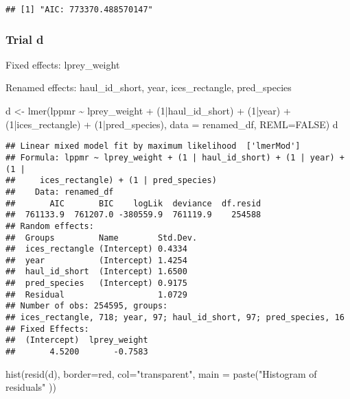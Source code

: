 \documentclass[
]{article}
\newenvironment{Shaded}{\begin{snugshade}}{\end{snugshade}}
\newcommand{\AttributeTok}[1]{\textcolor[rgb]{0.77,0.63,0.00}{#1}}
\newcommand{\ConstantTok}[1]{\textcolor[rgb]{0.00,0.00,0.00}{#1}}
\newcommand{\DecValTok}[1]{\textcolor[rgb]{0.00,0.00,0.81}{#1}}
\newcommand{\FunctionTok}[1]{\textcolor[rgb]{0.00,0.00,0.00}{#1}}
\newcommand{\NormalTok}[1]{#1}
\newcommand{\OtherTok}[1]{\textcolor[rgb]{0.56,0.35,0.01}{#1}}
\newcommand{\SpecialCharTok}[1]{\textcolor[rgb]{0.00,0.00,0.00}{#1}}
\newcommand{\StringTok}[1]{\textcolor[rgb]{0.31,0.60,0.02}{#1}}
\begin{document}
\begin{verbatim}
## [1] "AIC: 773370.488570147"
\end{verbatim}

\hypertarget{trial-d}{%
\subsubsection{Trial d}\label{trial-d}}

Fixed effects: lprey\_weight

Renamed effects: haul\_id\_short, year, ices\_rectangle, pred\_species

\begin{Shaded}
\begin{Highlighting}[]
\NormalTok{d }\OtherTok{\textless{}{-}} \FunctionTok{lmer}\NormalTok{(lppmr }\SpecialCharTok{\textasciitilde{}}\NormalTok{ lprey\_weight }\SpecialCharTok{+}\NormalTok{ (}\DecValTok{1}\SpecialCharTok{|}\NormalTok{haul\_id\_short) }\SpecialCharTok{+}\NormalTok{ (}\DecValTok{1}\SpecialCharTok{|}\NormalTok{year) }\SpecialCharTok{+}\NormalTok{ (}\DecValTok{1}\SpecialCharTok{|}\NormalTok{ices\_rectangle) }\SpecialCharTok{+}\NormalTok{ (}\DecValTok{1}\SpecialCharTok{|}\NormalTok{pred\_species), }\AttributeTok{data =}\NormalTok{ renamed\_df, }\AttributeTok{REML=}\ConstantTok{FALSE}\NormalTok{)}
\NormalTok{d}
\end{Highlighting}
\end{Shaded}

\begin{verbatim}
## Linear mixed model fit by maximum likelihood  ['lmerMod']
## Formula: lppmr ~ lprey_weight + (1 | haul_id_short) + (1 | year) + (1 |  
##     ices_rectangle) + (1 | pred_species)
##    Data: renamed_df
##       AIC       BIC    logLik  deviance  df.resid 
##  761133.9  761207.0 -380559.9  761119.9    254588 
## Random effects:
##  Groups         Name        Std.Dev.
##  ices_rectangle (Intercept) 0.4334  
##  year           (Intercept) 1.4254  
##  haul_id_short  (Intercept) 1.6500  
##  pred_species   (Intercept) 0.9175  
##  Residual                   1.0729  
## Number of obs: 254595, groups:  
## ices_rectangle, 718; year, 97; haul_id_short, 97; pred_species, 16
## Fixed Effects:
##  (Intercept)  lprey_weight  
##       4.5200       -0.7583
\end{verbatim}

\begin{Shaded}
\begin{Highlighting}[]
\FunctionTok{hist}\NormalTok{(}\FunctionTok{resid}\NormalTok{(d), }\AttributeTok{border=}\StringTok{\textquotesingle{}red\textquotesingle{}}\NormalTok{, }\AttributeTok{col=}\StringTok{"transparent"}\NormalTok{, }\AttributeTok{main =} \FunctionTok{paste}\NormalTok{(}\StringTok{"Histogram of residuals"}\NormalTok{ ))}
\end{Highlighting}
\end{Shaded}
\end{document}
